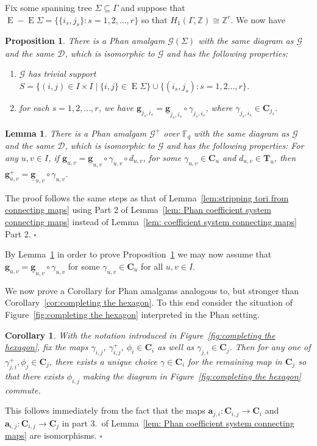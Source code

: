 \documentclass[12pt]{amsart}
\newtheorem{lemma}[theorem]{Lemma}
\newtheorem{corollary}[theorem]{Corollary}
\newtheorem{proposition}[theorem]{Proposition}
\theoremstyle{definition}
\newcommand{\bpf}{\noindent{\bf Proof}\hspace{7pt}}
\newcommand{\epf}{\qed}
\newcommand{\ble}{\begin{lemma}}
\newcommand{\ele}{\end{lemma}}
\newcommand{\bpr}{\begin{proposition}}
\newcommand{\epr}{\end{proposition}}
\newcommand{\bco}{\begin{corollary}}
\newcommand{\eco}{\end{corollary}}
\newcommand{\ul}{\underline}
\newcommand{\sbe}{\subseteq}
\newcommand{\cD}{{\mathcal D}}
\def\cD{{\mathcal D}}
\newcommand{\FF}{{\mathbb F}}
\newcommand{\ZZ}{{\mathbb Z}}
\newcommand{\after}{\mathbin{ \circ }}
\renewcommand{\qed}{\hfill $\square$}
\newcommand{\amgrpC}{{\mathbf{C}}}
\newcommand{\amgrpT}{{\mathbf{T}}}
\newcommand{\ama}{{\mathbf a}}
\newcommand{\amg}{{\mathbf g}}
\newcommand{\famg}{\ul{\mathbf g}}
\newcommand{\famG}{\ul{\mathscr{G}}}
\newcommand{\amG}{{\mathscr{G}}}
\DeclareMathOperator{\edg}{E}
\begin{document}
Fix some spanning tree $\Sigma\sbe \Gamma$ and suppose that $\edg-\edg\Sigma=\{\{i_s,j_s\}\colon s=1,2,\ldots,r\}$
 so that $H_1(\Gamma,\ZZ)\cong\ZZ^r$. 
We now have 
\bpr\label{prop:Phan trivial support on spanning tree}
There is a  Phan amalgam $\amG(\Sigma)$ with the same diagram as $\famG$ and the same $\cD$, which is isomorphic to $\amG$ and has the following properties:
\begin{enumerate}
\item $\amG$ has trivial support $S=\{(i,j)\in I\times I\mid \{i,j\}\in \edg \Sigma\}\cup \{(i_s,j_s)\colon s=1,2\ldots,r\}$.
\item for each  $s=1,2,\ldots,r$, we have $\amg_{j_s,i_s}=\famg_{j_s,i_s}\after\gamma_{j_s,i_s}$, where $\gamma_{j_s,i_s}\in \amgrpC_{j_s}$.
\end{enumerate}
\epr

\ble\label{lem:Phan stripping tori from connecting maps}
There is a  Phan  amalgam $\amG^+$ over $\FF_q$ with the same diagram as $\famG$ and the same $\cD$, which is isomorphic to $\amG$ and has the following properties:
For any $u,v\in I$, if $\amg_{u,v}=\famg_{u,v}\after \gamma_{u,v}\after d_{u,v}$,  for some $\gamma_{u,v}\in \amgrpC_{u}$ and $d_{u,v}\in \amgrpT_u$, then $\amg_{u,v}^+=\famg_{u,v}\after\gamma_{u,v}$.
\ele
\bpf
The proof follows the same steps as that of Lemma~\ref{lem:stripping tori from connecting maps} using Part 2 of Lemma~\ref{lem: Phan coefficient system connecting maps} instead of Lemma~\ref{lem: coefficient system connecting maps} Part 2. 
\epf

\medskip
By Lemma~\ref{lem:Phan stripping tori from connecting maps} in order to prove Proposition~\ref{prop:Phan trivial support on spanning tree} we may now assume that $\amg_{u,v}=\famg_{u,v}\after\gamma_{u,v}$ for some $\gamma_{u,v}\in \amgrpC_u$ for all $u,v\in I$.

We now prove a Corollary for Phan amalgams analogous to, but stronger than Corollary~\ref{cor:completing the hexagon}. To this end consider the situation of Figure~\ref{fig:completing the hexagon} interpreted in the Phan setting. 
\bco\label{cor:Phan completing the hexagon}
With the notation introduced in Figure~\ref{fig:completing the hexagon}, fix the maps $\gamma_{i,j}$, $\gamma^+_{i,j}$, $\phi_i \in \amgrpC_i$ as well as 
 $\gamma_{j,i}\in \amgrpC_j$. 
Then for any one of $\gamma^+_{j,i}, \phi_j\in \amgrpC_j$, there exists a unique choice $\gamma\in \amgrpC_i$ for the remaining map in $\amgrpC_j$  so that there exists $\phi_{i,j}$ making the diagram in Figure~\ref{fig:completing the hexagon} commute.
\eco
\bpf
This  follows immediately from the fact that the maps $\ama_{j,i}\colon \amgrpC_{i,j}\to \amgrpC_i$ and $\ama_{i,j}\colon \amgrpC_{i,j}\to \amgrpC_j$ in part 3.~of Lemma~\ref{lem: Phan coefficient system connecting maps} are isomorphisms.
\epf
\end{document}
